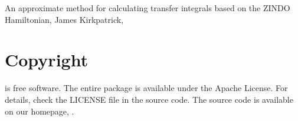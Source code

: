 \vspace{0.1cm}
\noindent
\cite{kirkpatrick_approximate_2007} An approximate method for calculating transfer integrals based on the ZINDO Hamiltonian, James Kirkpatrick, \\

\section*{Copyright}
\votcactp is free software. The entire package is available under the Apache License. For details, check
the LICENSE file in the source code. The \votcactp source code is available on our homepage, .

\vfill
